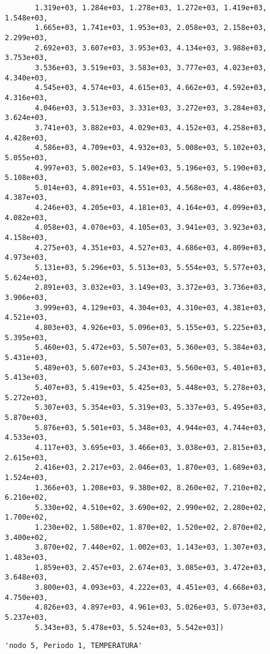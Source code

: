 \documentclass[11pt]{article}
\begin{document}
\begin{verbatim}
       1.319e+03, 1.284e+03, 1.278e+03, 1.272e+03, 1.419e+03, 1.548e+03,
       1.665e+03, 1.741e+03, 1.953e+03, 2.058e+03, 2.158e+03, 2.299e+03,
       2.692e+03, 3.607e+03, 3.953e+03, 4.134e+03, 3.988e+03, 3.753e+03,
       3.536e+03, 3.519e+03, 3.583e+03, 3.777e+03, 4.023e+03, 4.340e+03,
       4.545e+03, 4.574e+03, 4.615e+03, 4.662e+03, 4.592e+03, 4.316e+03,
       4.046e+03, 3.513e+03, 3.331e+03, 3.272e+03, 3.284e+03, 3.624e+03,
       3.741e+03, 3.882e+03, 4.029e+03, 4.152e+03, 4.258e+03, 4.428e+03,
       4.586e+03, 4.709e+03, 4.932e+03, 5.008e+03, 5.102e+03, 5.055e+03,
       4.997e+03, 5.002e+03, 5.149e+03, 5.196e+03, 5.190e+03, 5.108e+03,
       5.014e+03, 4.891e+03, 4.551e+03, 4.568e+03, 4.486e+03, 4.387e+03,
       4.246e+03, 4.205e+03, 4.181e+03, 4.164e+03, 4.099e+03, 4.082e+03,
       4.058e+03, 4.070e+03, 4.105e+03, 3.941e+03, 3.923e+03, 4.158e+03,
       4.275e+03, 4.351e+03, 4.527e+03, 4.686e+03, 4.809e+03, 4.973e+03,
       5.131e+03, 5.296e+03, 5.513e+03, 5.554e+03, 5.577e+03, 5.624e+03,
       2.891e+03, 3.032e+03, 3.149e+03, 3.372e+03, 3.736e+03, 3.906e+03,
       3.999e+03, 4.129e+03, 4.304e+03, 4.310e+03, 4.381e+03, 4.521e+03,
       4.803e+03, 4.926e+03, 5.096e+03, 5.155e+03, 5.225e+03, 5.395e+03,
       5.460e+03, 5.472e+03, 5.507e+03, 5.360e+03, 5.384e+03, 5.431e+03,
       5.489e+03, 5.607e+03, 5.243e+03, 5.560e+03, 5.401e+03, 5.413e+03,
       5.407e+03, 5.419e+03, 5.425e+03, 5.448e+03, 5.278e+03, 5.272e+03,
       5.307e+03, 5.354e+03, 5.319e+03, 5.337e+03, 5.495e+03, 5.870e+03,
       5.876e+03, 5.501e+03, 5.348e+03, 4.944e+03, 4.744e+03, 4.533e+03,
       4.117e+03, 3.695e+03, 3.466e+03, 3.038e+03, 2.815e+03, 2.615e+03,
       2.416e+03, 2.217e+03, 2.046e+03, 1.870e+03, 1.689e+03, 1.524e+03,
       1.366e+03, 1.208e+03, 9.380e+02, 8.260e+02, 7.210e+02, 6.210e+02,
       5.330e+02, 4.510e+02, 3.690e+02, 2.990e+02, 2.280e+02, 1.700e+02,
       1.230e+02, 1.580e+02, 1.870e+02, 1.520e+02, 2.870e+02, 3.400e+02,
       3.870e+02, 7.440e+02, 1.002e+03, 1.143e+03, 1.307e+03, 1.483e+03,
       1.859e+03, 2.457e+03, 2.674e+03, 3.085e+03, 3.472e+03, 3.648e+03,
       3.800e+03, 4.093e+03, 4.222e+03, 4.451e+03, 4.668e+03, 4.750e+03,
       4.826e+03, 4.897e+03, 4.961e+03, 5.026e+03, 5.073e+03, 5.237e+03,
       5.343e+03, 5.478e+03, 5.524e+03, 5.542e+03])
    \end{verbatim}

    
    
    \begin{verbatim}
'nodo 5, Periodo 1, TEMPERATURA'
    \end{verbatim}
\end{document}

